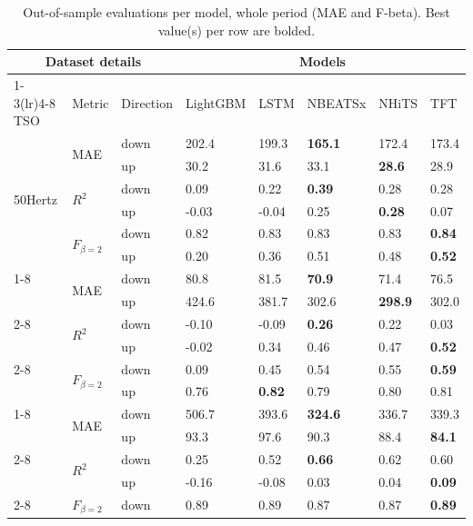 \begin{table}
\caption{Out-of-sample evaluations per model, whole period (MAE and F-beta). Best value(s) per row are bolded.}
\begin{tabular}{llllllll}
\toprule
\multicolumn{3}{c}{Dataset details} & \multicolumn{5}{c}{Models} \\
\cmidrule(lr){1-3}\cmidrule(lr){4-8}
TSO & Metric & Direction & LightGBM & LSTM & NBEATSx & NHiTS & TFT \\
\midrule
\multirow[t]{6}{*}{50Hertz} & \multirow[t]{2}{*}{MAE} & down & 202.4 & 199.3 & \textbf{165.1} & 172.4 & 173.4 \\
 &  & up & 30.2 & 31.6 & 33.1 & \textbf{28.6} & 28.9 \\
\cline{2-8}
 & \multirow[t]{2}{*}{$R^2$} & down & 0.09 & 0.22 & \textbf{0.39} & 0.28 & 0.28 \\
 &  & up & -0.03 & -0.04 & 0.25 & \textbf{0.28} & 0.07 \\
\cline{2-8}
 & \multirow[t]{2}{*}{$F_{\beta=2}$} & down & 0.82 & 0.83 & 0.83 & 0.83 & \textbf{0.84} \\
 &  & up & 0.20 & 0.36 & 0.51 & 0.48 & \textbf{0.52} \\
\cline{1-8} \cline{2-8}
\multirow[t]{6}{*}{Amprion} & \multirow[t]{2}{*}{MAE} & down & 80.8 & 81.5 & \textbf{70.9} & 71.4 & 76.5 \\
 &  & up & 424.6 & 381.7 & 302.6 & \textbf{298.9} & 302.0 \\
\cline{2-8}
 & \multirow[t]{2}{*}{$R^2$} & down & -0.10 & -0.09 & \textbf{0.26} & 0.22 & 0.03 \\
 &  & up & -0.02 & 0.34 & 0.46 & 0.47 & \textbf{0.52} \\
\cline{2-8}
 & \multirow[t]{2}{*}{$F_{\beta=2}$} & down & 0.09 & 0.45 & 0.54 & 0.55 & \textbf{0.59} \\
 &  & up & 0.76 & \textbf{0.82} & 0.79 & 0.80 & 0.81 \\
\cline{1-8} \cline{2-8}
\multirow[t]{6}{*}{TenneT DE} & \multirow[t]{2}{*}{MAE} & down & 506.7 & 393.6 & \textbf{324.6} & 336.7 & 339.3 \\
 &  & up & 93.3 & 97.6 & 90.3 & 88.4 & \textbf{84.1} \\
\cline{2-8}
 & \multirow[t]{2}{*}{$R^2$} & down & 0.25 & 0.52 & \textbf{0.66} & 0.62 & 0.60 \\
 &  & up & -0.16 & -0.08 & 0.03 & 0.04 & \textbf{0.09} \\
\cline{2-8}
 & \multirow[t]{2}{*}{$F_{\beta=2}$} & down & 0.89 & 0.89 & 0.87 & 0.87 & \textbf{0.89} \\

\end{tabular}
\end{table}
